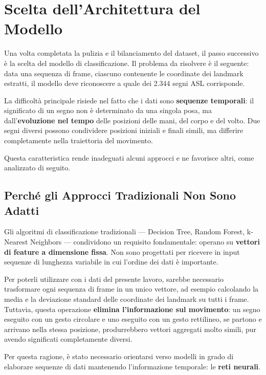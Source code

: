 
\section{Scelta dell'Architettura del Modello}

Una volta completata la pulizia e il bilanciamento del dataset, il passo successivo è la scelta del modello di classificazione. Il problema da risolvere è il seguente: data una sequenza di frame, ciascuno contenente le coordinate dei landmark estratti, il modello deve riconoscere a quale dei 2.344 segni ASL corrisponde.

La difficoltà principale risiede nel fatto che i dati sono \textbf{sequenze temporali}: il significato di un segno non è determinato da una singola posa, ma dall'\textbf{evoluzione nel tempo} delle posizioni delle mani, del corpo e del volto. Due segni diversi possono condividere posizioni iniziali e finali simili, ma differire completamente nella traiettoria del movimento.

Questa caratteristica rende inadeguati alcuni approcci e ne favorisce altri, come analizzato di seguito.

\subsection{Perché gli Approcci Tradizionali Non Sono Adatti}

Gli algoritmi di classificazione tradizionali --- Decision Tree, Random Forest, k-Nearest Neighbors --- condividono un requisito fondamentale: operano su \textbf{vettori di feature a dimensione fissa}. Non sono progettati per ricevere in input sequenze di lunghezza variabile in cui l'ordine dei dati è importante.

Per poterli utilizzare con i dati del presente lavoro, sarebbe necessario trasformare ogni sequenza di frame in un unico vettore, ad esempio calcolando la media e la deviazione standard delle coordinate dei landmark su tutti i frame. Tuttavia, questa operazione \textbf{elimina l'informazione sul movimento}: un segno eseguito con un gesto circolare e uno eseguito con un gesto rettilineo, se partono e arrivano nella stessa posizione, produrrebbero vettori aggregati molto simili, pur avendo significati completamente diversi.

Per questa ragione, è stato necessario orientarsi verso modelli in grado di elaborare sequenze di dati mantenendo l'informazione temporale: le \textbf{reti neurali}.

